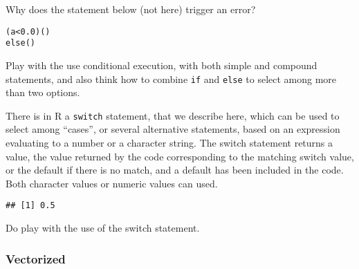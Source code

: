 \documentclass[paper=a4,headsepline,BCOR=12mm,twoside,open=right,%
titlepage,headings=small,fontsize=10pt,index=totoc,bibliography=totoc,%
captions=tableheading,captions=nooneline]{scrbook}\usepackage{knitr}
\begin{document}
Why does the statement below (not here) trigger an error?

\begin{knitrout}\footnotesize
{}\color{fgcolor}\begin{kframe}
\begin{alltt}
 (a < 0.0) ()
else ()
\end{alltt}
\end{kframe}
\end{knitrout}

Play with the use conditional execution, with both simple and compound statements, and also think how to combine \texttt{if} and \texttt{else} to select among more than two options.

There is in R a \texttt{switch} statement, that we describe here, which can be used to select among ``cases'', or several alternative statements, based on an expression evaluating to a number or a character string. The switch statement returns a value, the value returned by the code corresponding to the matching switch value, or the default if there is no match, and a default has been included in the code. Both character values or numeric values can used.

\begin{knitrout}\footnotesize
{}\color{fgcolor}\begin{kframe}
\begin{alltt}
 \hlkwb{<-} 
 \hlkwb{<-} 
             \hlstd{=} \hlstd{,}
             \hlstd{=}  \hlopt{/} \hlstd{,}
             \hlstd{=} \hlopt{/} \hlstd{,}
\hlstd{)}
\end{alltt}
\begin{verbatim}
## [1] 0.5
\end{verbatim}
\end{kframe}
\end{knitrout}

Do play with the use of the switch statement.

\subsubsection{Vectorized}
\end{document}
